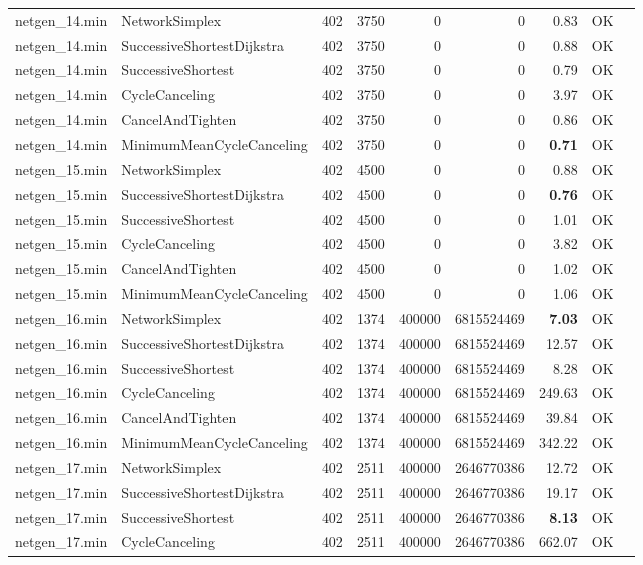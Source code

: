 \begin{longtable}{llrrrrrrl}
netgen\_14.min & NetworkSimplex & 402 & 3750 & 0 & 0 & 0.83 & OK \\
netgen\_14.min & SuccessiveShortestDijkstra & 402 & 3750 & 0 & 0 & 0.88 & OK \\
netgen\_14.min & SuccessiveShortest & 402 & 3750 & 0 & 0 & 0.79 & OK \\
netgen\_14.min & CycleCanceling & 402 & 3750 & 0 & 0 & 3.97 & OK \\
netgen\_14.min & CancelAndTighten & 402 & 3750 & 0 & 0 & 0.86 & OK \\
netgen\_14.min & MinimumMeanCycleCanceling & 402 & 3750 & 0 & 0 & \textbf{0.71} & OK \\
\midrule
netgen\_15.min & NetworkSimplex & 402 & 4500 & 0 & 0 & 0.88 & OK \\
netgen\_15.min & SuccessiveShortestDijkstra & 402 & 4500 & 0 & 0 & \textbf{0.76} & OK \\
netgen\_15.min & SuccessiveShortest & 402 & 4500 & 0 & 0 & 1.01 & OK \\
netgen\_15.min & CycleCanceling & 402 & 4500 & 0 & 0 & 3.82 & OK \\
netgen\_15.min & CancelAndTighten & 402 & 4500 & 0 & 0 & 1.02 & OK \\
netgen\_15.min & MinimumMeanCycleCanceling & 402 & 4500 & 0 & 0 & 1.06 & OK \\
\midrule
netgen\_16.min & NetworkSimplex & 402 & 1374 & 400000 & 6815524469 & \textbf{7.03} & OK \\
netgen\_16.min & SuccessiveShortestDijkstra & 402 & 1374 & 400000 & 6815524469 & 12.57 & OK \\
netgen\_16.min & SuccessiveShortest & 402 & 1374 & 400000 & 6815524469 & 8.28 & OK \\
netgen\_16.min & CycleCanceling & 402 & 1374 & 400000 & 6815524469 & 249.63 & OK \\
netgen\_16.min & CancelAndTighten & 402 & 1374 & 400000 & 6815524469 & 39.84 & OK \\
netgen\_16.min & MinimumMeanCycleCanceling & 402 & 1374 & 400000 & 6815524469 & 342.22 & OK \\
\midrule
netgen\_17.min & NetworkSimplex & 402 & 2511 & 400000 & 2646770386 & 12.72 & OK \\
netgen\_17.min & SuccessiveShortestDijkstra & 402 & 2511 & 400000 & 2646770386 & 19.17 & OK \\
netgen\_17.min & SuccessiveShortest & 402 & 2511 & 400000 & 2646770386 & \textbf{8.13} & OK \\
netgen\_17.min & CycleCanceling & 402 & 2511 & 400000 & 2646770386 & 662.07 & OK \\

\end{longtable}

